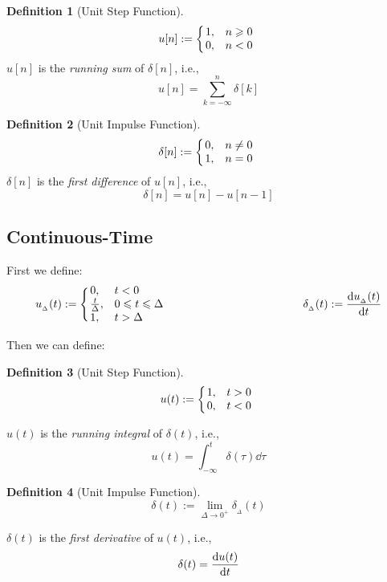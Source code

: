 \documentclass[10pt,UTF8]{article}
\makeatletter
\newenvironment{definition box}
{\begin{tcolorbox}[colback=blue!5!white,colframe=blue!75!black,parbox=false,before upper=\par,before lower=\par]}
{\end{tcolorbox}}
\theoremstyle{definition}
\newtheorem*{definition inner}{Definition}
\newenvironment{definition}[1][]
{\begin{definition box}\begin{definition inner}[#1]\hfill\par}
{\end{definition inner}\end{definition box}}
\theoremstyle{remark}
\newcommand{\mycases}[2][0.8]{
    \left\{\vphantom{\scalebox{#1}{
        $\begin{matrix}#2\end{matrix}$
    }}\right.\!\!\!\!
    \begin{array}{l@{\quad}l}#2\end{array}
}
\makeatother
\begin{document}
\noindent
\begin{minipage}[t]{.45\textwidth}
    \begin{definition}[Unit Step Function]
        \[
            u[n] := \mycases{
                1, & n \geqslant 0 \\
                0, & n < 0
            }
        \]
        $u[n]$ is the \emph{running sum} of $\delta[n]$, i.e.,
        \[
            u[n] = \sum_{k=-\infty}^n \delta[k]
        \]
    \end{definition}
\end{minipage}\hfill
\begin{minipage}[t]{.45\textwidth}
    \begin{definition}[Unit Impulse Function]
        \[
            \delta[n] := \mycases{
                0, & n \ne 0 \\
                1, & n = 0
            }
        \]
        $\delta[n]$ is the \emph{first difference} of $u[n]$, i.e.,
        \[
            \delta[n] = u[n] - u[n-1]
        \]
    \end{definition}
\end{minipage}

\subsection{Continuous-Time}

First we define:
\[
u_{_\Delta}(t) := \mycases{
    0, & t < 0 \\
    \frac{t}{\Delta}, & 0 \leqslant t \leqslant \Delta \\
    1, & t > \Delta
}
\qquad\qquad\qquad\qquad\qquad\qquad
\delta_{_\Delta}(t) := \dv{u_{_\Delta}(t)}{t}
\]

Then we can define:

\noindent
\begin{minipage}[t]{.45\textwidth}
\begin{definition}[Unit Step Function]
    \[
        u(t) := \mycases{
            1, & t > 0 \\
            0, & t < 0
        }
    \]
\end{definition}
    $u(t)$ is the \emph{running integral} of $\delta(t)$, i.e.,
    \[
        u(t) = \int_{-\infty}^t \delta(\tau) \dd\tau
    \]
\end{minipage}\hfill
\begin{minipage}[t]{.45\textwidth}
    \begin{definition}[Unit Impulse Function]
        \[
            \delta(t) := \lim_{\Delta\to 0^+}\delta_{_\Delta}(t)
        \]
    \end{definition}
    $\delta(t)$ is the \emph{first derivative} of $u(t)$, i.e.,
    \[
        \delta(t) = \dv{u(t)}{t}
    \]
\end{minipage}
\end{document}
